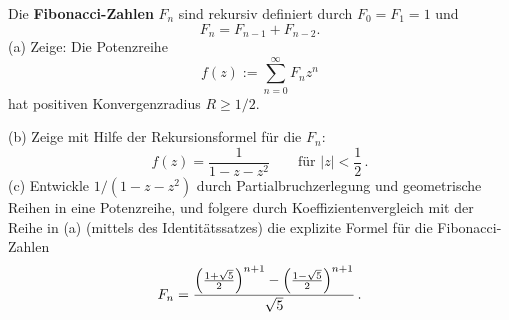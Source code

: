 \begin{prob}
Die {\bf Fibonacci-Zahlen} $F_n$ sind rekursiv definiert durch
$F_0=F_1=1$ und 
$$
   F_n=F_{n-1}+F_{n-2}. 
$$
(a) Zeige: Die Potenzreihe
$$
   f(z) := \sum_{n=0}^\infty F_nz^n
$$
hat positiven Konvergenzradius $R\geq 1/2$. 

(b) Zeige mit Hilfe der Rekursionsformel f\"ur die $F_n$:
$$
   f(z) = \frac{1}{1-z-z^2}\qquad \text{f\"ur }|z|<\frac12\,.
$$
(c) Entwickle $1/(1-z-z^2)$ durch Partialbruchzerlegung und
   geometrische Reihen in eine Potenzreihe, und folgere durch
   Koeffizientenvergleich mit der Reihe in (a) (mittels des
   Identit\"atssatzes) die explizite Formel f\"ur die Fibonacci-Zahlen
$$
   F_n = \frac{\Bigl(\frac{1+\sqrt{5}}{2}\Bigr)^{n+1} -
     \Bigl(\frac{1-\sqrt{5}}{2}\Bigr)^{n+1}}{\sqrt{5}}\,. 
$$
\end{prob}
